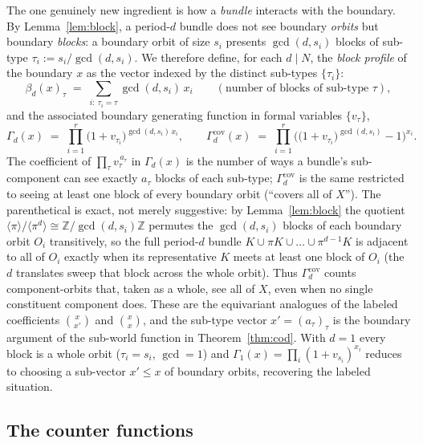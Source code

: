 \documentclass[11pt]{article}
\theoremstyle{plain}
\theoremstyle{definition}
\newcommand{\Z}{\mathbb{Z}}
\begin{document}
The one genuinely new ingredient is how a \emph{bundle} interacts with the boundary. By
Lemma~\ref{lem:block}, a period-$d$ bundle does not see boundary \emph{orbits} but boundary
\emph{blocks}: a boundary orbit of size $s_i$ presents $\gcd(d,s_i)$ blocks of sub-type
$\tau_i:=s_i/\gcd(d,s_i)$. We therefore define, for each $d\mid N$, the \emph{block profile} of the
boundary $x$ as the vector indexed by the distinct sub-types $\{\tau_i\}$:
\begin{equation}\label{eq:blockprofile}
\beta_d(x)_\tau \;=\; \sum_{i:\ \tau_i=\tau}\gcd(d,s_i)\,x_i
\qquad(\text{number of blocks of sub-type }\tau),
\end{equation}
and the associated boundary generating function in formal variables $\{v_\tau\}$,
\begin{equation}\label{eq:gf}
\Gamma_d(x)\;=\;\prod_{i=1}^{r}\big(1+v_{\tau_i}\big)^{\gcd(d,s_i)\,x_i},
\qquad
\Gamma_d^{\mathrm{cov}}(x)\;=\;\prod_{i=1}^{r}\Big(\big(1+v_{\tau_i}\big)^{\gcd(d,s_i)}-1\Big)^{x_i}.
\end{equation}
The coefficient of $\prod_\tau v_\tau^{\,a_\tau}$ in $\Gamma_d(x)$ is the number of ways a bundle's
sub-component can see exactly $a_\tau$ blocks of each sub-type; $\Gamma_d^{\mathrm{cov}}$ is the same
restricted to seeing at least one block of every boundary orbit (``covers all of $X$''). The
parenthetical is exact, not merely suggestive: by Lemma~\ref{lem:block} the quotient
$\langle\pi\rangle/\langle\pi^{d}\rangle\cong\Z/\gcd(d,s_i)\Z$ permutes the $\gcd(d,s_i)$ blocks of
each boundary orbit $O_i$ transitively, so the full period-$d$ bundle
$K\cup\pi K\cup\dots\cup\pi^{d-1}K$ is adjacent to all of $O_i$ exactly when its representative $K$
meets at least one block of $O_i$ (the $d$ translates sweep that block across the whole orbit).
Thus $\Gamma_d^{\mathrm{cov}}$ counts component-orbits that, taken as a whole, see all of $X$, even
when no single constituent component does. These are
the equivariant analogues of the labeled coefficients $\binom{x}{x'}$ and $\binom{x}{x}$, and the
sub-type vector $x'=(a_\tau)_\tau$ is the boundary argument of the sub-world function in
Theorem~\ref{thm:cod}. With $d=1$ every block is a whole orbit ($\tau_i=s_i$, $\gcd=1$) and
$\Gamma_1(x)=\prod_i(1+v_{s_i})^{x_i}$ reduces to choosing a sub-vector $x'\le x$ of boundary orbits,
recovering the labeled situation.

\subsection{The counter functions}
\end{document}
